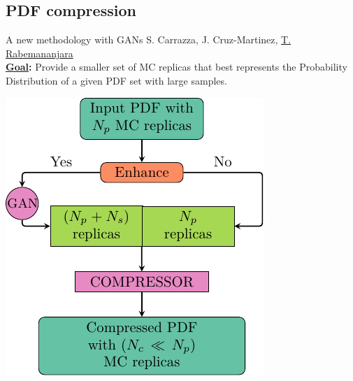 \providecommand{\iRef}[1]{{\tiny\color{HallowGreen} $[$#1$]$}}

\author[Tanjona Rabemananjara]{}

\subsection{PDF compression}

\begin{frame}{A new methodology with GANs}
	S. Carrazza, J. Cruz-Martinez, \underline{T. Rabemananjara} \\
	\textbf{\textcolor{HallowGreen}{\underline{Goal}:}} Provide a smaller set of MC 
	replicas that best represents the Probability Distribution of a given PDF set 
	with large samples.
	\vspace*{-0.1cm}	
	\begin{center}
	\includegraphics[height=.7\textheight]{./gan_compressor/imgs/pygans.pdf}
	\end{center}
\end{frame}

